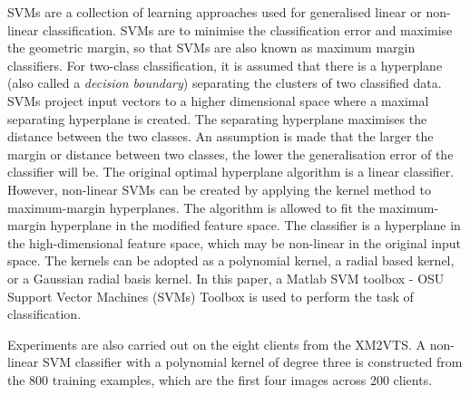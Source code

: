 \documentclass[a4paper,10pt]{article}
\begin{document}
SVMs are a collection of learning approaches used for generalised linear or non-linear classification. SVMs are to minimise the classification error and maximise the geometric margin, so that SVMs are also known as maximum margin classifiers. For two-class classification, it is assumed that there is a hyperplane (also called a \textit{decision boundary}) separating the clusters of two classified data. SVMs project input vectors to a higher dimensional space where a maximal separating hyperplane is created. The separating hyperplane maximises the distance between the two classes. An assumption is made that the larger the margin or distance between two classes, the lower the generalisation error of the classifier will be. The original optimal hyperplane algorithm is a linear classifier. However,  non-linear SVMs can be created by applying the kernel method \cite{Taylor2004} to maximum-margin hyperplanes. The algorithm is allowed to fit the maximum-margin hyperplane in the modified feature space. The classifier is a hyperplane in the high-dimensional feature space, which may be non-linear in the original input space. The kernels can be adopted as a polynomial kernel, a radial based kernel, or a Gaussian radial basis kernel. In this paper, a Matlab SVM toolbox - OSU Support Vector Machines (SVMs) Toolbox \cite{Ma2001} is used to perform the task of classification.

Experiments are also carried out on the eight clients from the XM2VTS. A non-linear SVM classifier with a polynomial kernel of degree three is constructed from the $800$ training examples, which are the first four images across 200 clients.
\end{document}
